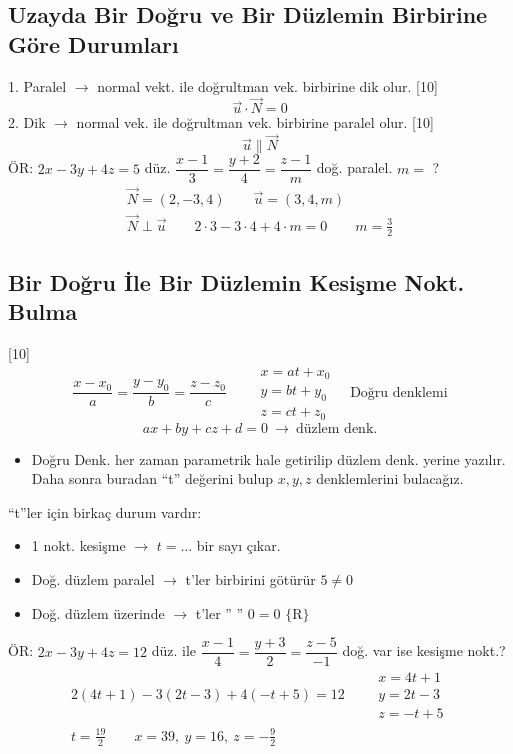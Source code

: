 \documentclass[11pt,a4paper]{article}
\begin{document}
\subsection{Uzayda Bir Doğru ve Bir Düzlemin Birbirine Göre Durumları}
1. Paralel $\to$ normal vekt. ile doğrultman vek. birbirine dik olur.
[10]
\[ \vec u\cdot\vec N=0 \]
2. Dik $\to$ normal vek. ile doğrultman vek. birbirine paralel olur.
[10]
\[ \vec u\parallel\vec N \]
ÖR: $2x-3y+4z=5$ düz. \quad $\dfrac{x-1}{3}=\dfrac{y+2}{4}=\dfrac{z-1}{m}$ doğ. paralel. $m=$ ?
\begin{gather*}
\vec N=(2,-3,4)\qquad \vec u=(3,4,m)\\
\vec N\perp\vec u\qquad 2\cdot3-3\cdot4+4\cdot m=0\qquad m=\frac32
\end{gather*}

\subsection{Bir Doğru İle Bir Düzlemin Kesişme Nokt. Bulma}
[10]
\[ \frac{x-x_0}{a}=\frac{y-y_0}{b}=\frac{z-z_0}{c}\qquad \begin{array}{l}x=at+x_0\\ y=bt+y_0\\ z=ct+z_0\end{array}\quad\text{Doğru denklemi} \]
\[ ax+by+cz+d=0\ \to\ \text{düzlem denk.} \]
\begin{itemize}[nosep]
\item Doğru Denk. her zaman parametrik hale getirilip düzlem denk. yerine yazılır. Daha sonra buradan ``t'' değerini bulup $x,y,z$ denklemlerini bulacağız.
\end{itemize}
``t''ler için birkaç durum vardır:
\begin{itemize}[nosep]
\item 1 nokt. kesişme $\to$ $t=\ldots$ bir sayı çıkar.
\item Doğ. düzlem paralel $\to$ t'ler birbirini götürür $5\neq0$
\item Doğ. düzlem üzerinde $\to$ t'ler '' '' $0=0$ $\{\mathrm{R}\}$
\end{itemize}
ÖR: $2x-3y+4z=12$ düz. ile $\dfrac{x-1}{4}=\dfrac{y+3}{2}=\dfrac{z-5}{-1}$ doğ. var ise kesişme nokt.?
\begin{gather*}
2(4t+1)-3(2t-3)+4(-t+5)=12\qquad \begin{array}{l}x=4t+1\\ y=2t-3\\ z=-t+5\end{array}\\
t=\frac{19}{2}\qquad x=39,\ y=16,\ z=-\frac92
\end{gather*}
\end{document}
